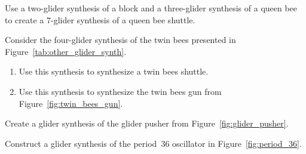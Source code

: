 \begin{multicols}{2}
\begin{problem}
\begin{enumerate}[label=(\alph*)]
		\noindent\begin{minipage}{\linewidth}
			\centering
			\label{fig:glider_pusher}\medskip
		\end{minipage}
	\end{enumerate}
\end{problem}


\mfilbreak


\begin{problem}\label{exer:queen_bee_synth}
	Use a two-glider synthesis of a block and a three-glider synthesis of a queen bee to create a $7$-glider synthesis of a queen bee shuttle.
\end{problem}


\mfilbreak


\begin{problem}\label{exer:twin_bee_shuttle_synth}
	Consider the four-glider synthesis of the twin bees presented in Figure~\ref{tab:other_glider_synth}.\smallskip
	
	\begin{enumerate}[label=(\alph*)]
		\item Use this synthesis to synthesize a twin bees shuttle.
		
		\item Use this synthesis to synthesize the twin bees gun from Figure~\ref{fig:twin_bees_gun}.
	\end{enumerate}
\end{problem}


\mfilbreak


\begin{problem}\label{exer:synthesize_glider_pusher}
	Create a glider synthesis of the glider pusher from Figure~\ref{fig:glider_pusher}.
\end{problem}


\mfilbreak


\begin{problem}\label{exer:oscillator_syntheses}
	Construct a glider synthesis of the period~36 oscillator in Figure~\ref{fig:period_36}.
\end{problem}


\mfilbreak



\end{multicols}
